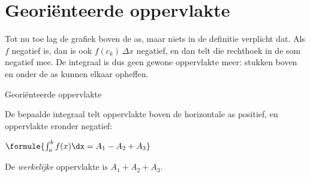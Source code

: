 \begin{oefeningen}
\end{oefeningen}

\section{Georiënteerde oppervlakte}

Tot nu toe lag de grafiek boven de as, maar niets in de definitie verplicht dat. Als $f$ negatief is, dan is ook $f(c_k)\,\Delta x$ negatief, en dan telt die rechthoek in de som negatief mee. De integraal is dus geen gewone oppervlakte meer: stukken boven en onder de as kunnen elkaar opheffen.

\begin{theorie}
\begin{stelling}{Georiënteerde oppervlakte}
\begin{minipage}[t]{.54\linewidth}
\vspace{0pt}
De bepaalde integraal telt oppervlakte boven de horizontale as positief, en oppervlakte eronder negatief:

\vspace{1.5mm}
\qquad $\formule{\int_a^b f(x)\dx = A_1 - A_2 + A_3}$

\vspace{1.5mm}
De \emph{werkelijke} oppervlakte is $A_1 + A_2 + A_3$.
\end{minipage}\hfill
\begin{minipage}[t]{.42\linewidth}
\vspace{0pt}
\end{minipage}
\end{stelling}
\end{theorie}

